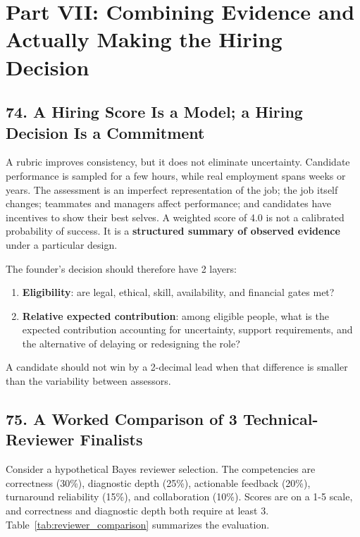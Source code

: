 \section*{Part VII: Combining Evidence and Actually Making the Hiring Decision}

\subsection*{74. A Hiring Score Is a Model; a Hiring Decision Is a Commitment}

A rubric improves consistency, but it does not eliminate uncertainty. Candidate performance is sampled for a few hours, while real employment spans weeks or years. The assessment is an imperfect representation of the job; the job itself changes; teammates and managers affect performance; and candidates have incentives to show their best selves. A weighted score of 4.0 is not a calibrated probability of success. It is a \textbf{structured summary of observed evidence} under a particular design.

The founder's decision should therefore have 2 layers:
\begin{enumerate}[leftmargin=*]
\item \textbf{Eligibility}: are legal, ethical, skill, availability, and financial gates met?
\item \textbf{Relative expected contribution}: among eligible people, what is the expected contribution accounting for uncertainty, support requirements, and the alternative of delaying or redesigning the role?
\end{enumerate}
A candidate should not win by a 2-decimal lead when that difference is smaller than the variability between assessors.

\subsection*{75. A Worked Comparison of 3 Technical-Reviewer Finalists}

Consider a hypothetical Bayes reviewer selection. The competencies are correctness (30\%), diagnostic depth (25\%), actionable feedback (20\%), turnaround reliability (15\%), and collaboration (10\%). Scores are on a 1-5 scale, and correctness and diagnostic depth both require at least 3. Table~\ref{tab:reviewer_comparison} summarizes the evaluation.


